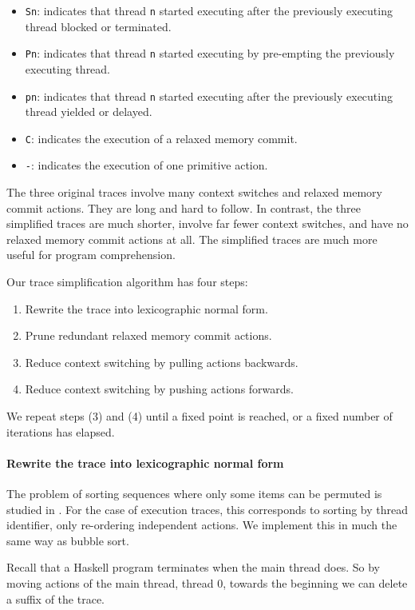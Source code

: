 \begin{itemize}
\item \verb|Sn|: indicates that thread \verb|n| started executing
  after the previously executing thread blocked or terminated.
\item \verb|Pn|: indicates that thread \verb|n| started executing by
  pre-empting the previously executing thread.
\item \verb|pn|: indicates that thread \verb|n| started executing
  after the previously executing thread yielded or delayed.
\item \verb|C|: indicates the execution of a relaxed memory commit.
\item \verb|-|: indicates the execution of one primitive action.
\end{itemize}

The three original traces involve many context
switches and relaxed memory commit actions.  They are long and hard to
follow.  In contrast, the three simplified traces are much shorter,
involve far fewer context switches, and have no relaxed memory commit
actions at all.  The simplified traces are much more useful for
program comprehension.

Our trace simplification algorithm has four steps:

\begin{enumerate}
\item Rewrite the trace into lexicographic normal form.
\item Prune redundant relaxed memory commit actions.
\item Reduce context switching by pulling actions backwards.
\item Reduce context switching by pushing actions forwards.
\end{enumerate}

We repeat steps (3) and (4) until a fixed point is reached, or a fixed
number of iterations has elapsed.

\paragraph{Rewrite the trace into lexicographic normal form}
The problem of sorting sequences where only some items can be permuted
is studied in \cite{anisimov1979}.  For the case of execution traces,
this corresponds to sorting by thread identifier, only re-ordering
independent actions.  We implement this in much the same way as bubble
sort.

Recall that a Haskell program terminates when the main thread does.
So by moving actions of the main thread, thread 0, towards the
beginning we can delete a suffix of the trace.

